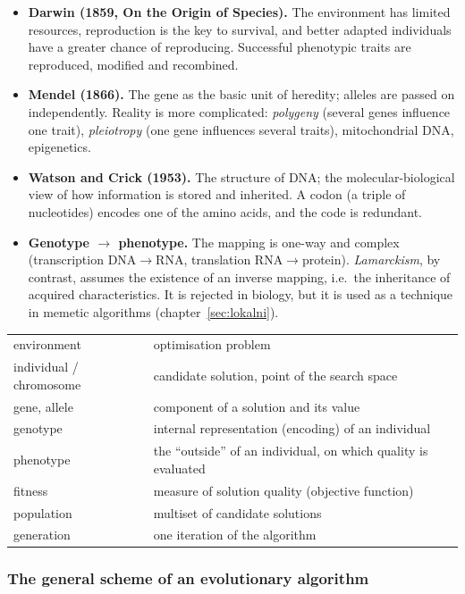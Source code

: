 \documentclass[11pt,a4paper]{article}
\theoremstyle{definition}
\providecommand{\uv}[1]{``#1''}
\begin{document}
\begin{itemize}
\item \textbf{Darwin (1859, On the Origin of Species).} The environment has
  limited resources, reproduction is the key to survival, and better adapted
  individuals have a greater chance of reproducing. Successful phenotypic traits
  are reproduced, modified and recombined.
\item \textbf{Mendel (1866).} The gene as the basic unit of heredity; alleles are
  passed on independently. Reality is more complicated: \emph{polygeny} (several
  genes influence one trait), \emph{pleiotropy} (one gene influences several
  traits), mitochondrial DNA, epigenetics.
\item \textbf{Watson and Crick (1953).} The structure of DNA; the
  molecular-biological view of how information is stored and inherited. A codon
  (a triple of nucleotides) encodes one of the amino acids, and the code is
  redundant.
\item \textbf{Genotype $\to$ phenotype.} The mapping is one-way and complex
  (transcription DNA${\to}$RNA, translation RNA${\to}$protein).
  \emph{Lamarckism}, by contrast, assumes the existence of an inverse mapping,
  i.e.\ the inheritance of acquired characteristics. It is rejected in biology,
  but it is used as a technique in memetic algorithms
  (chapter~\ref{sec:lokalni}).
\end{itemize}

\begin{defbox}
\begin{tabular}{@{}ll@{}}
environment & optimisation problem \\
individual / chromosome & candidate solution, point of the search space \\
gene, allele & component of a solution and its value \\
genotype & internal representation (encoding) of an individual \\
phenotype & the \uv{outside} of an individual, on which quality is evaluated \\
fitness & measure of solution quality (objective function) \\
population & multiset of candidate solutions \\
generation & one iteration of the algorithm \\
\end{tabular}
\end{defbox}

\subsubsection{The general scheme of an evolutionary algorithm}
\end{document}
